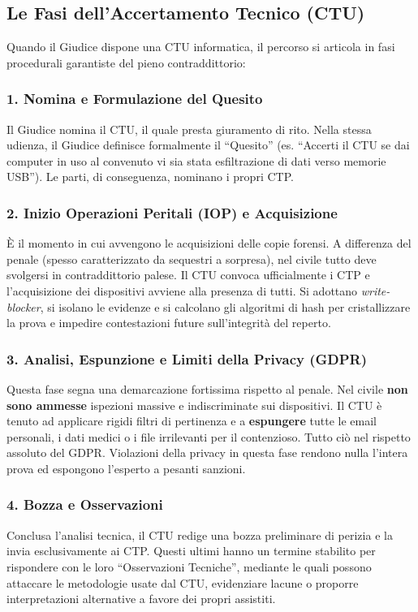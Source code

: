 \documentclass[11pt,a4paper]{article}
\begin{document}
\subsection{Le Fasi dell'Accertamento Tecnico (CTU)}

Quando il Giudice dispone una CTU informatica, il percorso si articola in fasi procedurali garantiste del pieno contraddittorio:

\subsubsection{1. Nomina e Formulazione del Quesito}
Il Giudice nomina il CTU, il quale presta giuramento di rito. Nella stessa udienza, il Giudice definisce formalmente il ``Quesito'' (es. ``Accerti il CTU se dai computer in uso al convenuto vi sia stata esfiltrazione di dati verso memorie USB''). Le parti, di conseguenza, nominano i propri CTP.

\subsubsection{2. Inizio Operazioni Peritali (IOP) e Acquisizione}
È il momento in cui avvengono le acquisizioni delle copie forensi. A differenza del penale (spesso caratterizzato da sequestri a sorpresa), nel civile tutto deve svolgersi in contraddittorio palese. Il CTU convoca ufficialmente i CTP e l'acquisizione dei dispositivi avviene alla presenza di tutti. Si adottano \textit{write-blocker}, si isolano le evidenze e si calcolano gli algoritmi di hash per cristallizzare la prova e impedire contestazioni future sull'integrità del reperto.

\subsubsection{3. Analisi, Espunzione e Limiti della Privacy (GDPR)}
Questa fase segna una demarcazione fortissima rispetto al penale. Nel civile \textbf{non sono ammesse} ispezioni massive e indiscriminate sui dispositivi. 
Il CTU è tenuto ad applicare rigidi filtri di pertinenza e a \textbf{espungere} tutte le email personali, i dati medici o i file irrilevanti per il contenzioso. 
Tutto ciò nel rispetto assoluto del GDPR. Violazioni della privacy in questa fase rendono nulla l'intera prova ed espongono l'esperto a pesanti sanzioni.

\subsubsection{4. Bozza e Osservazioni}
Conclusa l'analisi tecnica, il CTU redige una bozza preliminare di perizia e la invia esclusivamente ai CTP. Questi ultimi hanno un termine stabilito per rispondere con le loro ``Osservazioni Tecniche'', mediante le quali possono attaccare le metodologie usate dal CTU, evidenziare lacune o proporre interpretazioni alternative a favore dei propri assistiti.
\end{document}

